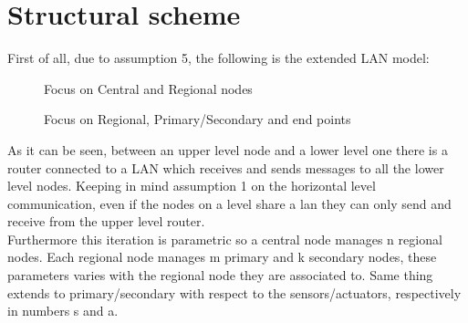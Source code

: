 \documentclass[11pt]{article}
\begin{document}
\section{Structural scheme}
First of all, due to assumption 5, the following is the extended LAN model:\\
\begin{figure}[H]
  \caption{Focus on Central and Regional nodes}
\end{figure}
\begin{figure}[H]
  \caption{Focus on Regional, Primary/Secondary and end points}
\end{figure}
As it can be seen, between an upper level node and a lower level one there is a router connected to a LAN which receives and sends messages to all the lower level nodes. Keeping in mind assumption 1 on the horizontal level communication, even if the nodes on a level share a lan they can only send and receive from the upper level router.\\
Furthermore this iteration is parametric so a central node manages n regional nodes. Each regional node manages m primary and k secondary nodes, these parameters varies with the regional node they are associated to. Same thing extends to primary/secondary with respect to the sensors/actuators, respectively in numbers s and a.\\
\end{document}
